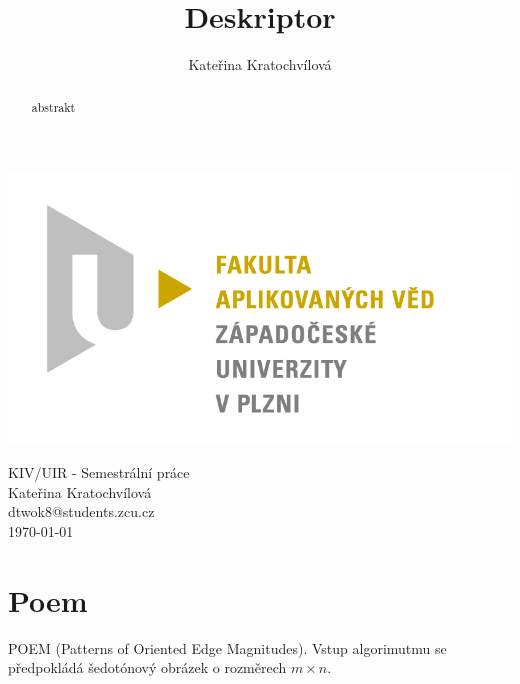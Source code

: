 \documentclass{report}
\title{Deskriptor}
\author{Kateřina Kratochvílová}
\begin{document}
 
\begin{titlepage}
\begin{flushleft} 
{\includegraphics[width=.5\textwidth]{./img/fav_logo.jpg}\\[3cm]}
\end{flushleft}
\begin{center}

{\Huge KIV/UIR - Semestrální práce}
\\[0.3cm]
\vspace{1.7cm}
{\Large Kateřina Kratochvílová} \\
\vspace{0.2cm}
{\normalsize dtwok8@students.zcu.cz}\\

{\large \today}
\end{center}
\end{titlepage}


\tableofcontents
\thispagestyle{empty} %

\begin{abstract}
abstrakt  
\end{abstract}


\chapter{Poem}
POEM (Patterns of Oriented Edge Magnitudes). Vstup algorimutmu se předpokládá šedotónový obrázek o rozměrech  $m \times n$.
\end{document}
